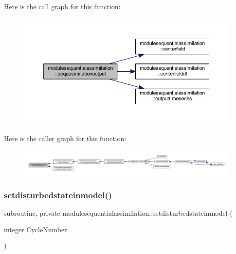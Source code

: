 Here is the call graph for this function\+:\nopagebreak
\begin{figure}[H]
\begin{center}
\leavevmode
\includegraphics[width=350pt]{namespacemodulesequentialassimilation_a80cfe86b207ec25cc26de13d8bad205c_cgraph}
\end{center}
\end{figure}
Here is the caller graph for this function\+:\nopagebreak
\begin{figure}[H]
\begin{center}
\leavevmode
\includegraphics[width=350pt]{namespacemodulesequentialassimilation_a80cfe86b207ec25cc26de13d8bad205c_icgraph}
\end{center}
\end{figure}
\mbox{\label{namespacemodulesequentialassimilation_a063e8f5d94cc80db103c79a0ec38a127}} 
\subsubsection{\texorpdfstring{setdisturbedstateinmodel()}{setdisturbedstateinmodel()}}
{\footnotesize\ttfamily subroutine, private modulesequentialassimilation\+::setdisturbedstateinmodel (\begin{DoxyParamCaption}\item[{integer}]{Cycle\+Number }\end{DoxyParamCaption})\hspace{0.3cm}{\ttfamily [private]}}


